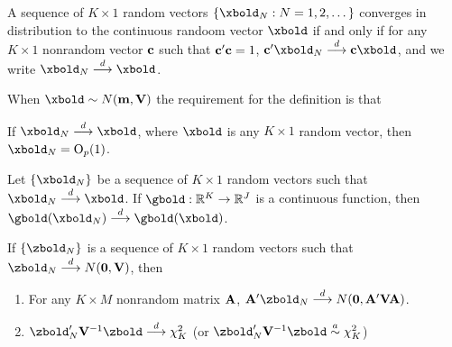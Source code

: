 \documentclass[11pt, oneside, a4paper, article]{article}
\numberwithin{equation}{section}
\begin{document}
\begin{defn} 
	A sequence of $K \times 1$ random vectors $\seq{\xbold_{N}: N=1,2, \dots}$ converges in distribution to the continuous randoom vector $\xbold$
	if and only if
	for any $K \times 1$ nonrandom vector $\mathbf{c}$ such that
	$\mathbf{c}' \mathbf{c} = 1$, $\mbf{c}' \xbold_{N} \arrowd \mbf{c} \xbold$, 
	and we write $\xbold_{N} \arrowd \xbold$.
\end{defn}

\begin{remark}
	When $\xbold \sim N(\mbf{m}, \Vbold)$ 
	the requirement for the definition is that
\end{remark}

\begin{lem}
	If $\xbold_{N} \arrowd \xbold$,
	where $\xbold$ is any $K \times 1$ random vector, 
	then $\xbold_{N} = \bigOp(1)$.
\end{lem}

\begin{lem}
	Let $\seq{\xbold_{N}}$ be a sequence of $K \times 1$ random vectors such that
	$\xbold_{N} \arrowd \xbold$.
	If $\gbold: \R^{K} \to \R^{J}$ is a continuous function, then
	$\gbold(\xbold_{N}) \arrowd \gbold(\xbold)$.
\end{lem}

\begin{cor}
If $\seq{\zbold_{N}}$ is a sequence of $K \times 1$ random vectors such that
$\zbold_{N} \arrowd N(\mbs{0}, \Vbold)$, then
\vspace{-1 ex}
\begin{enumerate}[noitemsep]
\item For any $K \times M$ nonrandom matrix $\mathbf{A}$,
		$\Abold' \zbold_{N} \arrowd N(\mbs{0}, \Abold' \Vbold \Abold)$.

\item $\zbold_{N}' \Vbold^{-1}\zbold \arrowd \chi_{K}^{2}$ 
		(or $\zbold_{N}' \Vbold^{-1} \zbold \asim \chi_{K}^{2}$)
\end{enumerate}
\end{cor}
\end{document}
